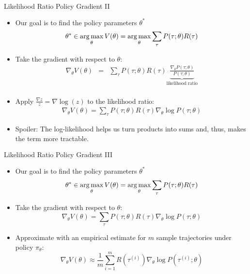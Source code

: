 \documentclass[aspectratio=169]{../latex_main/tntbeamer}  %
\begin{document}
\begin{frame}[c]{Likelihood Ratio Policy Gradient II}
	\vspace{-1.5em}
	\begin{itemize}
		\item Our goal is to find the policy parameters $\theta^*$
		$$\theta^* \in \operatorname*{arg\,max}_{\theta} V(\theta) = \operatorname*{arg\,max}_{\theta}\sum_{\tau} P(\tau; \theta) R(\tau) $$
		\item Take the gradient with respect to $\theta$:
		\small
		\begin{eqnarray*}
		\nabla_\theta V(\theta) &=& \sum_{\tau} P(\tau; \theta)  R(\tau) \underbrace{\frac{\nabla_\theta P(\tau; \theta)}{P(\tau; \theta)}}_{\text{likelihood ratio}} \\ 
		\end{eqnarray*}
            \item Apply $ \frac{\nabla z }{z} = \nabla \log(z)$ to the likelihood ratio:
            \begin{eqnarray*}
                \nabla_\theta V(\theta) = \sum_{\tau} P(\tau; \theta)  R(\tau) \nabla_\theta \log P(\tau; \theta)
            \end{eqnarray*}
            \item Spoiler: The log-likelihood helps us turn products into sums and, thus, makes the term more tractable.
     	
	\end{itemize}
	
\end{frame}
\begin{frame}[c]{Likelihood Ratio Policy Gradient III}
	
	\begin{itemize}
		\item Our goal is to find the policy parameters $\theta^*$
		$$\theta^* \in \operatorname*{arg\,max}_{\theta} V(\theta) = \operatorname*{arg\,max}_{\theta}\sum_{\tau} P(\tau; \theta) R(\tau) $$
		\item Take the gradient with respect to $\theta$:
		$$ \nabla_\theta V(\theta) = \sum_{\tau} P(\tau; \theta)  R(\tau) \nabla_\theta \log P(\tau; \theta) $$ 
		\item Approximate with an empirical estimate for $m$ sample trajectories under
		policy $\pi_\theta$:
		$$\nabla_\theta V(\theta) \approx \frac{1}{m} \sum_{i=1}^{m} R(\tau^{(i)}) \nabla_\theta \log P(\tau^{(i)}; \theta) $$
		
	\end{itemize}
	
\end{frame}
\end{document}
